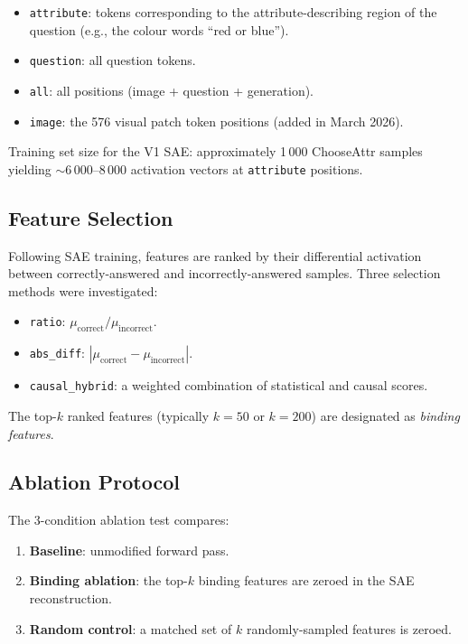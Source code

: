 \documentclass[11pt,a4paper]{article}
\begin{document}
\begin{itemize}[noitemsep]
  \item \texttt{attribute}: tokens corresponding to the attribute-describing region of the question
    (e.g., the colour words ``red or blue'').
  \item \texttt{question}: all question tokens.
  \item \texttt{all}: all positions (image + question + generation).
  \item \texttt{image}: the 576 visual patch token positions (added in March 2026).
\end{itemize}

Training set size for the V1 SAE: approximately 1\,000 ChooseAttr samples yielding
$\sim$6\,000--8\,000 activation vectors at \texttt{attribute} positions.

\subsection{Feature Selection}

Following SAE training, features are ranked by their differential activation between
correctly-answered and incorrectly-answered samples.
Three selection methods were investigated:

\begin{itemize}[noitemsep]
  \item \texttt{ratio}: $\mu_{\mathrm{correct}} / \mu_{\mathrm{incorrect}}$.
  \item \texttt{abs\_diff}: $|\mu_{\mathrm{correct}} - \mu_{\mathrm{incorrect}}|$.
  \item \texttt{causal\_hybrid}: a weighted combination of statistical and causal scores.
\end{itemize}

The top-$k$ ranked features (typically $k = 50$ or $k = 200$) are designated as
\emph{binding features}.

\subsection{Ablation Protocol}

The 3-condition ablation test compares:
\begin{enumerate}[noitemsep]
  \item \textbf{Baseline}: unmodified forward pass.
  \item \textbf{Binding ablation}: the top-$k$ binding features are zeroed in the SAE
    reconstruction.
  \item \textbf{Random control}: a matched set of $k$ randomly-sampled features is zeroed.
\end{enumerate}
\end{document}
